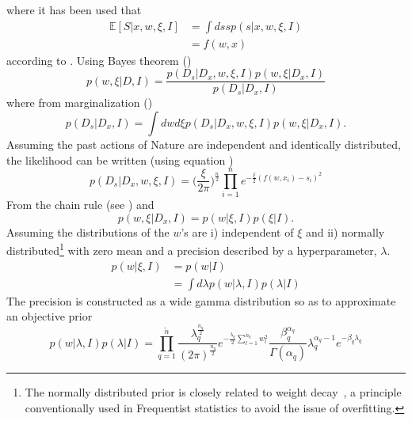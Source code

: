 where it has been used that
\begin{equation}
	\begin{split}
		\mathbb{E}[S|x,w,\xi,I] &= \int ds s p(s|x,w,\xi,I) \\
		&= f(w,x)
	\end{split}
\end{equation}
according to . Using Bayes theorem ()
\begin{equation}
	p(w,\xi|D,I) = \frac{p(D_s|D_x,w,\xi,I)p(w,\xi|D_x,I)}{p(D_s|D_x,I)}
	\label{eq:bayes2}
\end{equation}
where from marginalization ()
\begin{equation}
	p(D_s|D_x,I) = \int dw d\xi p(D_s|D_x,w,\xi,I)p(w,\xi|D_x,I).
\end{equation}
Assuming the past actions of Nature are independent and identically distributed, the likelihood can be written (using equation )
\begin{equation}
	p(D_s|D_x,w,\xi,I) = \bigg(\frac{\xi}{2\pi}\bigg)^\frac{n}{2}\prod_{i=1}^n e^{-\frac{\xi}{2}(f(w,x_i)-s_i)^2}
	\label{reg:likelihood}
\end{equation}
From the chain rule (see ) and 
\begin{equation}
	p(w,\xi|D_x,I) = p(w|\xi,I)p(\xi|I).
\end{equation}
Assuming the distributions of the $w$'s are i) independent of $\xi$ and ii) normally distributed\footnote{The normally distributed prior is closely related to weight decay~\citep{Plaut1986}, a principle conventionally used in Frequentist statistics to avoid the issue of overfitting.} with zero mean and a precision described by a hyperparameter, $\lambda$. 	 
\begin{equation}
	\begin{split}
		p(w|\xi,I) & = p(w|I)\\
		& = \int d\lambda p(w|\lambda,I)p(\lambda|I)
	\end{split}
	\label{eq:prior1}
\end{equation}
The precision is constructed as a wide gamma distribution so as to approximate an objective prior
\begin{equation}
	p(w|\lambda,I)p(\lambda|I)
	= \prod_{q=1}^{\tilde{n}} \frac{\lambda_q^\frac{n_q}{2}}{(2\pi)^\frac{n_q}{2}}e^{-\frac{\lambda_q}{2}\sum_{l=1}^{n_q}w_l^2}\frac{\beta_q^{\alpha_q}}{\Gamma(\alpha_q)}\lambda_q^{\alpha_q-1}e^{-\beta_q \lambda_q}
	\label{eq:prior}
\end{equation}
